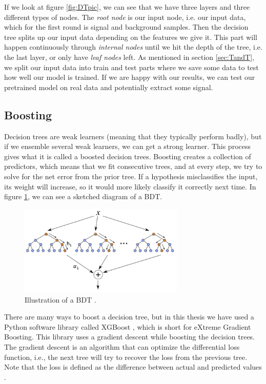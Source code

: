 If we look at figure \ref{fig:DTpic}, we can see that we have three layers and three different types of nodes. The \textit{root node} is our input node, i.e. our input data, which for the first round is signal and background samples. Then the decision tree splits up our input data depending on the features we give it. This part will happen continuously through \textit{internal nodes} until we hit the depth of the tree, i.e. the last layer, or only have \textit{leaf nodes} left. As mentioned in section \ref{sec:TandT}, we split our input data into train and test parts where we save some data to test how well our model is trained. If we are happy with our results, we can test our pretrained model on real data and potentially extract some signal.


\subsection{Boosting}
Decision trees are weak learners (meaning that they typically perform badly), but if we ensemble several weak learners, we can get a strong learner. This process gives what it is called a boosted decision trees. Boosting creates a collection of predictors, which means that we fit consecutive trees, and at every step, we try to solve for the net error from the prior tree. If a hypothesis misclassifies the input, its weight will increase, so it would more likely classify it correctly next time. In figure \ref{fig:BDT}, we can see a sketched diagram of a BDT.


\begin{figure}[H]
    \centering
    \includegraphics[width = 0.7\textwidth]{Figures/FromOnline/BDT.png}
    \caption{Illustration of a BDT \cite{BDTpic}.}
    \label{fig:BDT}
\end{figure}

There are many ways to boost a decision tree, but in this thesis we have used a Python software library called XGBoost \cite{xgboostAbout}, which is short for eXtreme Gradient Boosting. This library uses a gradient descent while boosting the decision trees. The gradient descent is an algorithm that can optimize the differential loss function, i.e., the next tree will try to recover the loss from the previous tree. Note that the loss is defined as the difference between actual and predicted values \cite{BDT}. 

